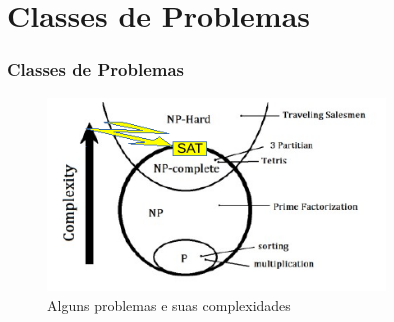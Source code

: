 \documentclass{beamer}
\begin{document}

\section{Classes de Problemas}


\begin{frame}
\frametitle{Classes de Problemas}

\begin{figure}[ht!]
 \centering
 \includegraphics[width=0.8\textwidth , height=0.6\textheight]{classes_problemas.pdf}
 \caption{Alguns problemas e suas complexidades} 
\end{figure}

\end{frame}
\end{document}
